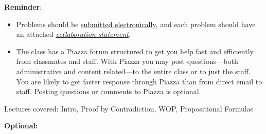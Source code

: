 \documentclass[handout]{mcs}
\begin{document}
\renewcommand{\reading}{Part~\bref{part:proofs}{. \emph{Proofs:
      Introduction}}; Chapter~\bref{proofs_chap}{.\ \emph{What is a
      Proof?}}; Chapter~\bref{well_ordering_chap}{.\ \emph{The Well
      Ordering Principle}}--\bref{factor_sec}{.\ \emph{Factoring into
      Primes}} ; Chapter~\bref{logicform_chap}{
    through~\bref{equiv_valid_sec}{\emph{Equivalence and
        Validity}},~\bref{SAT_sec}{, covering \emph{Propositional
        Logic}} (optional:~\bref{prop_algebra_sec}{\emph{Algebra of
        Propositions}})}.  These assigned readings do \textbf{not}
  include the Problem sections.  (Many of the problems in the text
  will appear as class or homework problems.)}


\medskip

\textbf{Reminder}:

\begin{itemize}

\item Problems should be
  \href{http://courses.csail.mit.edu/6.042/spring14/submission.shtml}
       {submitted electronically}, and each problem should have an
       attached
\href{http://courses.csail.mit.edu/6.042/spring14/submission.shtml#collab-state}
{\emph{collaboration statement}}.

\item The class has a
  \href{http://piazza.com/mit/fall2013/6042j18062j/home}
       {Piazza forum} structured to get you help fast and efficiently
       from classmates and staff.  With Piazza you may post
       questions---both administrative and content related---to the
       entire class or to just the staff.  You are likely to get
       faster response through Piazza than from direct email to staff.
       Posting questions or comments to Piazza is optional.
\end{itemize}

\begin{staffnotes}
Lectures covered: Intro, Proof by Contradiction, WOP, Propositional Formulas
\end{staffnotes}









\begin{center}
  \large \textbf{Optional:}
\end{center}

\end{document}
